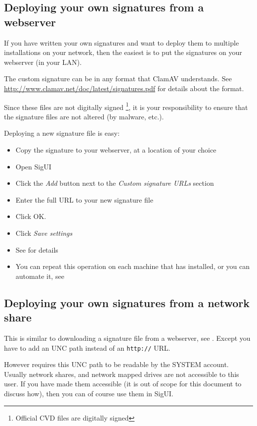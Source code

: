 \subsection{Deploying your own signatures from a webserver}
\label{sec:customweb}
If you have written your own signatures and want to deploy them to multiple
\CW installations on your network, then the easiest is to put the signatures on your webserver (in your LAN).

The custom signature can be in any format that \gls{ClamAV} understands.
See \url{http://www.clamav.net/doc/latest/signatures.pdf} for details about the format.

Since these files are not digitally signed \footnote{Official \gls{CVD} files are digitally signed}, it is your responsibility to ensure that the signature files are not altered (by malware, etc.).

Deploying a new signature file is easy:
\begin{itemize}
\item Copy the signature to your webserver, at a location of your choice
\item Open SigUI
\item Click the \emph{Add} button next to the \emph{Custom signature URLs} section
\item Enter the full URL to your new signature file
\item Click OK.
\item Click \emph{Save settings}
\item See  for details
\item You can repeat this operation on each machine that has \CW installed, or you can automate it, see 
\end{itemize}

\subsection{Deploying your own signatures from a network share}
\label{sec:customnet}
This is similar to downloading a signature file from a webserver, see .
Except you have to add an \gls{UNC path} instead of an \verb+http://+ URL.

However \CW requires this \gls{UNC path} to be readable by the \gls{SYSTEM account}.
Usually network shares, and network mapped drives are not accessible to this user.
If you have made them accessible (it is out of scope for this document to discuss how), then you can of course use them in SigUI.


